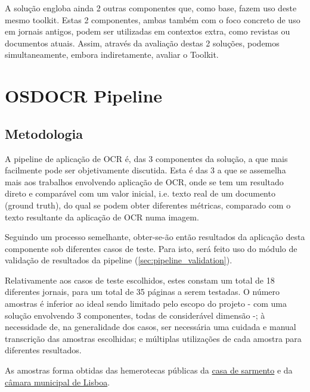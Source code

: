 A solução engloba ainda 2 outras componentes que, como base, fazem uso deste mesmo toolkit. Estas 2 componentes, ambas também com o foco concreto de uso em jornais antigos, podem ser utilizadas em contextos extra, como revistas ou documentos atuais. Assim, através da avaliação destas 2 soluções, podemos simultaneamente, embora indiretamente, avaliar o Toolkit.



\section{OSDOCR Pipeline}


\subsection{Metodologia}


A pipeline de aplicação de OCR é, das 3 componentes da solução, a que mais facilmente pode ser objetivamente discutida. Esta é das 3 a que se assemelha mais aos trabalhos envolvendo aplicação de OCR, onde se tem um resultado direto e comparável com um valor inicial, i.e. texto real de um documento (ground truth), do qual se podem obter diferentes métricas, comparado com o texto resultante da aplicação de OCR numa imagem.

Seguindo um processo semelhante, obter-se-ão então resultados da aplicação desta componente sob diferentes casos de teste. Para isto, será feito uso do módulo de validação de resultados da pipeline (\ref{sec:pipeline_validation}).

Relativamente aos casos de teste escolhidos, estes constam um total de 18 diferentes jornais, para um total de 35 páginas a serem testadas. O número amostras é inferior ao ideal sendo limitado pelo escopo do projeto - com uma solução envolvendo 3 componentes, todas de considerável dimensão -; à necessidade de, na generalidade dos casos, ser necessária uma cuidada e manual transcrição das amostras escolhidas; e múltiplas utilizações de cada amostra para diferentes resultados.

As amostras forma obtidas das hemerotecas públicas da \href{https://www.csarmento.uminho.pt/site/s/hemeroteca-bpb/page/hemeroteca-digital-da-bpb}{casa de sarmento} e da \href{https://hemerotecadigital.lisboa.pt/publicacoes}{câmara municipal de Lisboa}.

